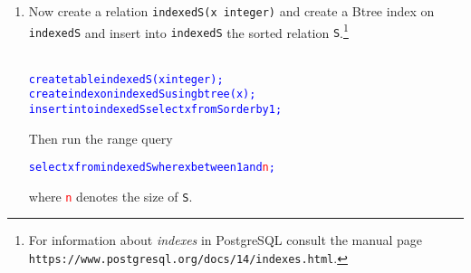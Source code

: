 \documentclass{article}
\newcommand{\blue}[1]{{\color{blue}#1}}
\begin{document}
\begin{enumerate}[resume]
\begin{enumerate}
%
%


\item %

Now create a relation {\tt indexedS(x integer)} and create a Btree index on {\tt indexedS} and insert into {\tt indexedS} the sorted relation {\tt S}.\footnote{For information about \emph{indexes} in PostgreSQL consult the manual page
\blue{\tt https://www.postgresql.org/docs/14/indexes.html}.}
\begin{alltt}
\textcolor{blue}{
create table indexedS (x integer);
create index on indexedS using btree (x);
insert into indexedS select x from S order by 1;}
\end{alltt}
Then run the range query 
\begin{alltt}
\textcolor{blue}{select x from indexedS where x between 1 and \textcolor{red}{n};}
\end{alltt}
where \textcolor{red}{\tt n} denotes the size of {\tt S}.  


\end{enumerate}
\end{enumerate}
\end{document}
